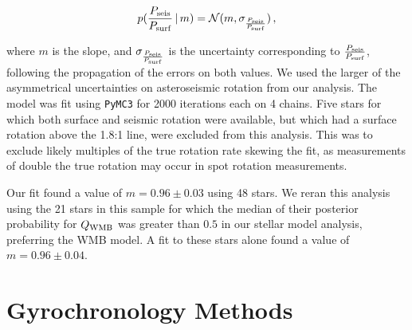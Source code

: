 \documentclass[12pt]{article}
\begin{document}
\begin{equation}
	p(\frac{P_{\rm seis}}{P_{\rm surf}}\, |\, m) = \mathcal{N}(m, \sigma_\frac{P_{\rm seis}}{P_{\rm surf}})\, ,
\end{equation}

\noindent where $m$ is the slope, and $\sigma_\frac{P_{\rm seis}}{P_{\rm surf}}$ is the uncertainty corresponding to $\frac{P_{\rm seis}}{P_{\rm surf}}$, following the propagation of the errors on both values. We used the larger of the asymmetrical uncertainties on asteroseismic rotation from our analysis. The model was fit using \texttt{PyMC3} for 2000 iterations each on 4 chains. Five stars for which both surface and seismic rotation were available, but which had a surface rotation above the 1.8:1 line, were excluded from this analysis. This was to exclude likely multiples of the true rotation rate skewing the fit, as measurements of double the true rotation may occur in spot rotation measurements.

Our fit found a value of $m = 0.96 \pm 0.03$ using 48 stars. We reran this analysis using the 21 stars in this sample for which the median of their posterior probability for $Q_{\rm WMB}$ was greater than $0.5$ in our stellar model analysis, preferring the WMB model. A fit to these stars alone found a value of $m = 0.96 \pm 0.04$.

\section{Gyrochronology Methods}\label{s:gyro}
\end{document}
